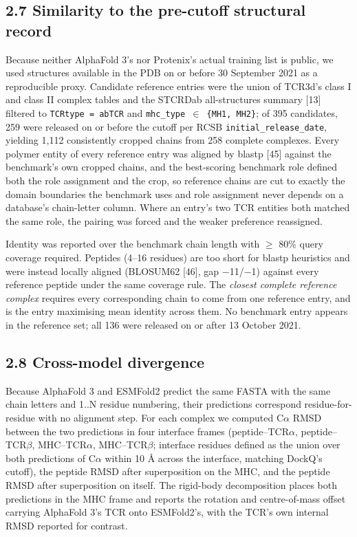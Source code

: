 \documentclass[
  11pt,
]{article}
\begin{document}
\subsection{2.7 Similarity to the pre-cutoff structural
record}\label{similarity-to-the-pre-cutoff-structural-record}

Because neither AlphaFold 3's nor Protenix's actual training list is
public, we used structures available in the PDB on or before 30
September 2021 as a reproducible proxy. Candidate reference entries were
the union of TCR3d's class I and class II complex tables and the STCRDab
all-structures summary {[}13{]} filtered to \texttt{TCRtype\ =\ abTCR}
and \texttt{mhc\_type\ \ensuremath{\in}\ \{MH1,\ MH2\}}; of 395 candidates, 259 were
released on or before the cutoff per RCSB
\texttt{initial\_release\_date}, yielding 1,112 consistently cropped
chains from 258 complete complexes. Every polymer entity of every
reference entry was aligned by blastp {[}45{]} against the benchmark's own
cropped chains, and the best-scoring benchmark role defined both the
role assignment and the crop, so reference chains are cut to exactly the
domain boundaries the benchmark uses and role assignment never depends
on a database's chain-letter column. Where an entry's two TCR entities
both matched the same role, the pairing was forced and the weaker
preference reassigned.

Identity was reported over the benchmark chain length with \ensuremath{\geq} 80\% query
coverage required. Peptides (4--16 residues) are too short for blastp
heuristics and were instead locally aligned (BLOSUM62 {[}46{]}, gap \ensuremath{-}11/\ensuremath{-}1)
against every reference peptide under the same coverage rule. The
\emph{closest complete reference complex} requires every corresponding
chain to come from one reference entry, and is the entry maximising mean
identity across them. No benchmark entry appears in the reference set;
all 136 were released on or after 13 October 2021.

\subsection{2.8 Cross-model divergence}\label{cross-model-divergence}

Because AlphaFold 3 and ESMFold2 predict the same FASTA with the same
chain letters and 1..N residue numbering, their predictions correspond
residue-for-residue with no alignment step. For each complex we computed
C\ensuremath{\alpha} RMSD between the two predictions in four interface frames
(peptide--TCR\ensuremath{\alpha}, peptide--TCR\ensuremath{\beta}, MHC--TCR\ensuremath{\alpha}, MHC--TCR\ensuremath{\beta}; interface residues
defined as the union over both predictions of C\ensuremath{\alpha} within 10 \AA{} across the
interface, matching DockQ's cutoff), the peptide RMSD after
superposition on the MHC, and the peptide RMSD after superposition on
itself. The rigid-body decomposition places both predictions in the MHC
frame and reports the rotation and centre-of-mass offset carrying
AlphaFold 3's TCR onto ESMFold2's, with the TCR's own internal RMSD
reported for contrast.
\end{document}
